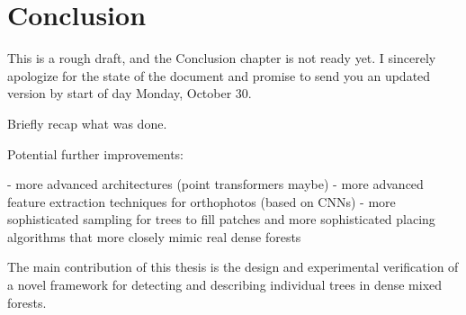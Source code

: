 \chapter{Conclusion}\label{cap:conclusion}


This is a rough draft, and the Conclusion chapter is not ready yet. I sincerely apologize for the state of the document and promise to send you an updated version by start of day Monday, October 30.

Briefly recap what was done.

Potential further improvements:

- more advanced architectures (point transformers maybe)
- more advanced feature extraction techniques for orthophotos (based on CNNs)
- more sophisticated sampling for trees to fill patches and more sophisticated placing algorithms that more closely mimic real dense forests

The main contribution of  this thesis is the design and experimental verification of a novel framework for detecting and describing individual trees in dense mixed forests.